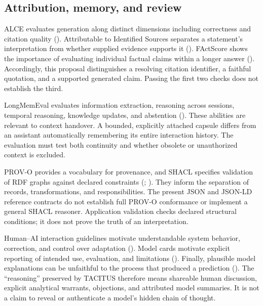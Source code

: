 \documentclass[
  11pt,
]{article}
\begin{document}
\subsection{Attribution, memory, and
review}\label{attribution-memory-and-review}

ALCE evaluates generation along distinct dimensions including
correctness and citation quality (). Attributable to Identified Sources separates a statement's
interpretation from whether supplied evidence supports it
(). FActScore shows the
importance of evaluating individual factual claims within a longer
answer (). Accordingly, this
proposal distinguishes a resolving citation identifier, a faithful
quotation, and a supported generated claim. Passing the first two checks
does not establish the third.

LongMemEval evaluates information extraction, reasoning across sessions,
temporal reasoning, knowledge updates, and abstention
(). These abilities are relevant to
context handover. A bounded, explicitly attached capsule differs from an
assistant automatically remembering its entire interaction history. The
evaluation must test both continuity and whether obsolete or
unauthorized context is excluded.

PROV-O provides a vocabulary for provenance, and SHACL specifies
validation of RDF graphs against declared constraints
(;
). They inform
the separation of records, transformations, and responsibilities. The
present JSON and JSON-LD reference contracts do not establish full
PROV-O conformance or implement a general SHACL reasoner. Application
validation checks declared structural conditions; it does not prove the
truth of an interpretation.

Human--AI interaction guidelines motivate understandable system
behavior, correction, and control over adaptation
(). Model cards motivate
explicit reporting of intended use, evaluation, and limitations
(). Finally, plausible
model explanations can be unfaithful to the process that produced a
prediction (). The
``reasoning'' preserved by TACITUS therefore means shareable human
discussion, explicit analytical warrants, objections, and attributed
model summaries. It is not a claim to reveal or authenticate a model's
hidden chain of thought.
\end{document}
